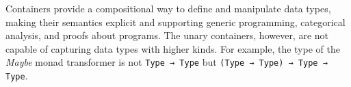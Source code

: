 \begin{code}%
\>[0]\AgdaSpace{}%
\AgdaSymbol{:}\AgdaSpace{}%
\AgdaSpace{}%
\AgdaSpace{}%
\AgdaSpace{}%
\AgdaSpace{}%
\<%
\\
\>[0]\AgdaSpace{}%
\AgdaSpace{}%
\AgdaSymbol{=}\AgdaSpace{}%
\<%
\\
\>[0]\AgdaSpace{}%
\AgdaSymbol{(}\AgdaSpace{}%
\AgdaSymbol{)}\AgdaSpace{}%
\AgdaSymbol{=}\AgdaSpace{}%
\<%
\\
\>[0]\AgdaSpace{}%
\AgdaSymbol{(}\AgdaSpace{}%
\AgdaSpace{}%
\AgdaSymbol{)}\AgdaSpace{}%
\AgdaSymbol{=}\AgdaSpace{}%
\AgdaSpace{}%
\<%
\\
\>[0]\AgdaSpace{}%
\AgdaSymbol{(}\AgdaSpace{}%
\AgdaSpace{}%
\AgdaSpace{}%
\AgdaSymbol{)}\AgdaSpace{}%
\AgdaSymbol{=}\AgdaSpace{}%
\AgdaSpace{}%
\AgdaSpace{}%
\<%
\\
\>[0]\<%
\end{code}

Containers provide a compositional way to define and manipulate data types, making their semantics explicit and supporting generic programming, categorical analysis, and proofs about programs. The unary containers, however, are not capable of capturing data types with higher kinds. For example, the type of the \textit{Maybe} monad transformer is not \texttt{Type → Type} but \texttt{(Type → Type) → Type → Type}.

\begin{code}%
\>[0]\AgdaSpace{}%
\AgdaSymbol{:}\AgdaSpace{}%
\AgdaSymbol{(}\AgdaSpace{}%
\AgdaSpace{}%
\AgdaSymbol{)}\AgdaSpace{}%
\AgdaSpace{}%
\AgdaSpace{}%
\AgdaSpace{}%
\<%
\\
\>[0]\AgdaSpace{}%
\AgdaSpace{}%
\AgdaSpace{}%
\AgdaSymbol{=}\AgdaSpace{}%
\AgdaSpace{}%
\AgdaSymbol{(}\AgdaSpace{}%
\AgdaSpace{}%
\AgdaSymbol{)}\<%
\end{code}

